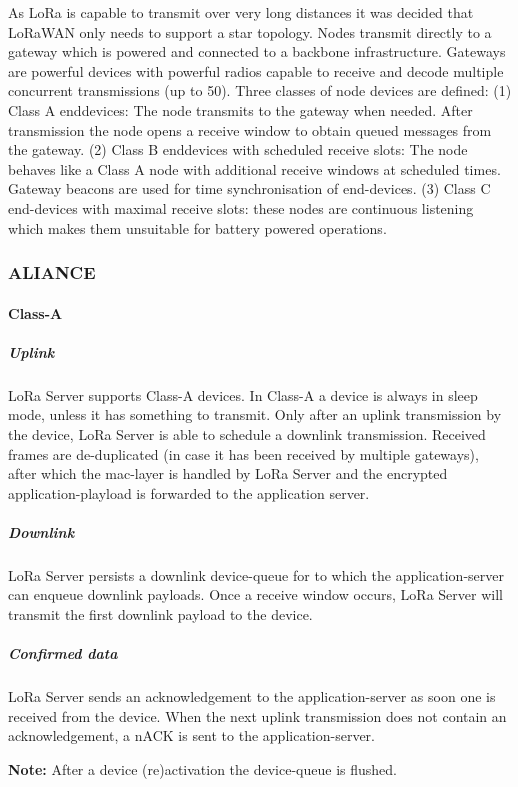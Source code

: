 As LoRa is capable to transmit over very long distances it was decided that LoRaWAN only needs to support a star topology.
Nodes transmit directly to a gateway which is powered and connected to a backbone infrastructure.
Gateways are powerful devices with powerful radios capable to receive and decode multiple concurrent transmissions (up to 50).
Three classes of node devices are defined:
	(1) Class A enddevices:
	The node transmits to the gateway when needed.
After transmission the node opens a receive window to obtain queued messages from the gateway.
(2) Class B enddevices with scheduled receive slots:
	The node behaves like a Class A node with additional receive windows at scheduled times.
Gateway beacons are used for time synchronisation of end-devices.
(3) Class C end-devices with maximal receive slots:
	these nodes are continuous listening which makes them unsuitable for battery powered operations.


\subsubsection{ALIANCE}


\paragraph{Class-A}

\subparagraph{Uplink}
LoRa Server supports Class-A devices.
In Class-A a device is always in sleep mode,
	unless it has something to transmit.
Only after an uplink transmission by the device,
	LoRa Server is able to schedule a downlink transmission.
Received frames are de-duplicated (in case it has been received by multiple gateways),
	after which the mac-layer is handled by LoRa Server and the encrypted application-playload is forwarded to the application server.

\subparagraph{Downlink}
LoRa Server persists a downlink device-queue for to which the application-server can enqueue downlink payloads.
Once a receive window occurs,
	LoRa Server will transmit the first downlink payload to the device.

\subparagraph{Confirmed data}
LoRa Server sends an acknowledgement to the application-server as soon one is received from the device.
When the next uplink transmission does not contain an acknowledgement,
	a nACK is sent to the application-server.

\textbf{Note:}
	After a device (re)activation the device-queue is flushed.




